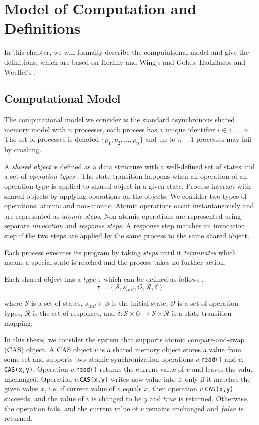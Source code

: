 \def\CTeXPreproc{Created by ctex v0.2.14, don't edit!}
\chapter{Model of Computation and Definitions}
In this chapter, we will formally describe the computational model and give the definitions, which are based on Herlihy and Wing's \cite{Herlihy:1990:LCC:78969.78972} and Golab, Hadzilacos and Woelfel's \cite{InProc-GHHW2007a}.

\section{Computational Model}
The computational model we consider is the standard asynchronous shared memory model with $n$ processes, each process has a unique identifier $i \in {1,...,n}$. The set of processes is denoted $\{p_1, p_2,...,p_n\}$ and up to $n-1$ processes may fail by crashing.

A \emph{shared object} is defined as a data structure with a well-defined set of states and a set of \emph{operation types} \cite{InProc-GHHW2007a}. The state transition happens when an operation of an operation type is applied to shared object in a given state. Process interact with shared objects by applying operations on the objects. We consider two types of operations: atomic and non-atomic. Atomic operations occur instantaneously and are represented as \emph{atomic steps}. Non-atomic operations are represented using separate \emph{invocation} and \emph{response steps}. A response step matches an invocation step if the two steps are applied by the same process to the same shared
object.

Each process executes its program by taking \emph{steps} until it \emph{terminates} which means a special state is reached and the process takes no further action. 

Each shared object has a $type$ $\tau$ which can be defined as follows \cite{InProc-GHHW2007a},
$$\tau = (\mathcal{S}, s_{init},\mathcal{O},\mathcal{R} ,\delta )$$

where $\mathcal{S}$ is a set of states, $s_{init} \in \mathcal{S}$ is the initial state, $\mathcal{O}$ is a set of operation types, $\mathcal{R}$ is the set of responses, and $\delta :\mathcal{S} \times \mathcal{O} \to \mathcal{S} \times \mathcal{R}$ is a state transition mapping.

In this thesis, we consider the system that supports atomic compare-and-swap (CAS) object. A CAS object $v$ is a shared memory object stores a value from some set and supports two atomic synchronization operations $v.$\texttt{read()} and $v.$\texttt{CAS(x,y)}. Operation $v.$\texttt{read()} returns the current value of $v$ and leaves the value unchanged. Operation $v.$\texttt{CAS(x,y)} writes new value into it only if it matches the given value $x$, i.e, if current value of $v$ equals $x$, then operation $v.$\texttt{CAS(x,y)} succeeds, and the value of $v$ is changed to be $y$ and $true$ is returned. Otherwise, the operation fails, and the current value of $v$ remains unchanged and $false$ is returned.

